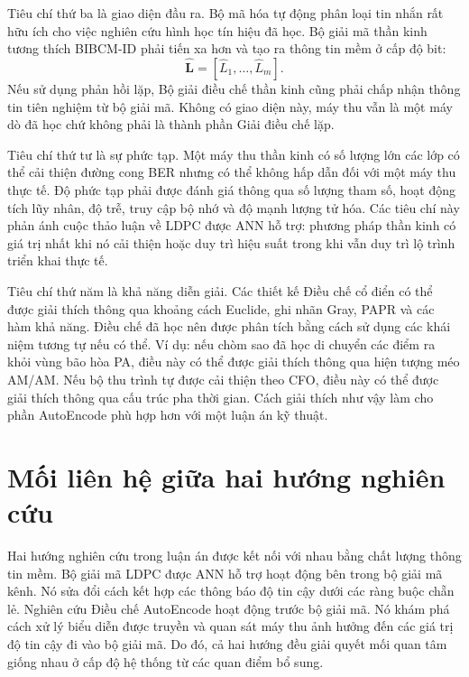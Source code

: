 Tiêu chí thứ ba là giao diện đầu ra. Bộ mã hóa tự động phân loại tin nhắn rất hữu ích cho việc nghiên cứu hình học tín hiệu đã học. Bộ giải mã thần kinh tương thích BIBCM-ID phải tiến xa hơn và tạo ra thông tin mềm ở cấp độ bit:
\begin{equation}
  \mathbf{\hat{L}}=[\hat{L}_1,\ldots,\hat{L}_m].
\end{equation}
Nếu sử dụng phản hồi lặp, Bộ giải điều chế thần kinh cũng phải chấp nhận thông tin tiên nghiệm từ bộ giải mã. Không có giao diện này, máy thu vẫn là một máy dò đã học chứ không phải là thành phần Giải điều chế lặp.

Tiêu chí thứ tư là sự phức tạp. Một máy thu thần kinh có số lượng lớn các lớp có thể cải thiện đường cong BER nhưng có thể không hấp dẫn đối với một máy thu thực tế. Độ phức tạp phải được đánh giá thông qua số lượng tham số, hoạt động tích lũy nhân, độ trễ, truy cập bộ nhớ và độ mạnh lượng tử hóa. Các tiêu chí này phản ánh cuộc thảo luận về LDPC được ANN hỗ trợ: phương pháp thần kinh có giá trị nhất khi nó cải thiện hoặc duy trì hiệu suất trong khi vẫn duy trì lộ trình triển khai thực tế.

Tiêu chí thứ năm là khả năng diễn giải. Các thiết kế Điều chế cổ điển có thể được giải thích thông qua khoảng cách Euclide, ghi nhãn Gray, PAPR và các hàm khả năng. Điều chế đã học nên được phân tích bằng cách sử dụng các khái niệm tương tự nếu có thể. Ví dụ: nếu chòm sao đã học di chuyển các điểm ra khỏi vùng bão hòa PA, điều này có thể được giải thích thông qua hiện tượng méo AM/AM. Nếu bộ thu trình tự được cải thiện theo CFO, điều này có thể được giải thích thông qua cấu trúc pha thời gian. Cách giải thích như vậy làm cho phần AutoEncode phù hợp hơn với một luận án kỹ thuật.

\section{Mối liên hệ giữa hai hướng nghiên cứu}
Hai hướng nghiên cứu trong luận án được kết nối với nhau bằng chất lượng thông tin mềm. Bộ giải mã LDPC được ANN hỗ trợ hoạt động bên trong bộ giải mã kênh. Nó sửa đổi cách kết hợp các thông báo độ tin cậy dưới các ràng buộc chẵn lẻ. Nghiên cứu Điều chế AutoEncode hoạt động trước bộ giải mã. Nó khám phá cách xử lý biểu diễn được truyền và quan sát máy thu ảnh hưởng đến các giá trị độ tin cậy đi vào bộ giải mã. Do đó, cả hai hướng đều giải quyết mối quan tâm giống nhau ở cấp độ hệ thống từ các quan điểm bổ sung.

